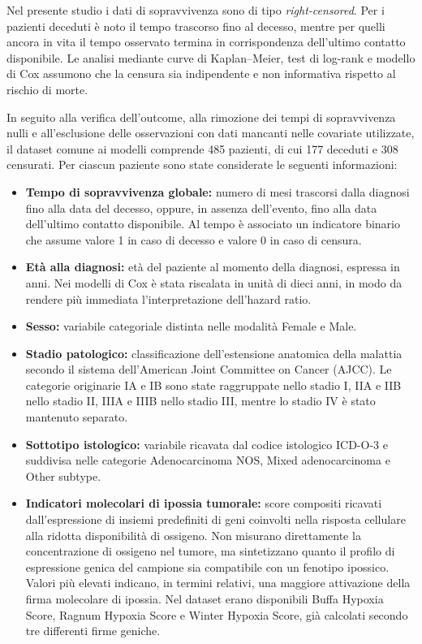 \documentclass[12pt,a4paper]{article}
\begin{document}
Nel presente studio i dati di sopravvivenza sono di tipo \textit{right-censored}. Per i pazienti deceduti è noto il tempo trascorso fino al decesso, mentre per quelli ancora in vita il tempo osservato termina in corrispondenza dell'ultimo contatto disponibile. Le analisi mediante curve di Kaplan--Meier, test di log-rank e modello di Cox assumono che la censura sia indipendente e non informativa rispetto al rischio di morte.

In seguito alla verifica dell'outcome, alla rimozione dei tempi di sopravvivenza nulli e all'esclusione delle osservazioni con dati mancanti nelle covariate utilizzate, il dataset comune ai modelli comprende 485 pazienti, di cui 177 deceduti e 308 censurati. Per ciascun paziente sono state considerate le seguenti informazioni:

\begin{itemize}

    \item \textbf{Tempo di sopravvivenza globale:} numero di mesi trascorsi dalla diagnosi fino alla data del decesso, oppure, in assenza dell'evento, fino alla data dell'ultimo contatto disponibile. Al tempo è associato un indicatore binario che assume valore 1 in caso di decesso e valore 0 in caso di censura.

    \item \textbf{Età alla diagnosi:} età del paziente al momento della diagnosi, espressa in anni. Nei modelli di Cox è stata riscalata in unità di dieci anni, in modo da rendere più immediata l'interpretazione dell'hazard ratio.

    \item \textbf{Sesso:} variabile categoriale distinta nelle modalità Female e Male.

    \item \textbf{Stadio patologico:} classificazione dell'estensione anatomica della malattia secondo il sistema dell'American Joint Committee on Cancer (AJCC). Le categorie originarie IA e IB sono state raggruppate nello stadio I, IIA e IIB nello stadio II, IIIA e IIIB nello stadio III, mentre lo stadio IV è stato mantenuto separato.

    \item \textbf{Sottotipo istologico:} variabile ricavata dal codice istologico ICD-O-3 e suddivisa nelle categorie Adenocarcinoma NOS, Mixed adenocarcinoma e Other subtype.

    \item \textbf{Indicatori molecolari di ipossia tumorale:} score compositi ricavati dall'espressione di insiemi predefiniti di geni coinvolti nella risposta cellulare alla ridotta disponibilità di ossigeno. Non misurano direttamente la concentrazione di ossigeno nel tumore, ma sintetizzano quanto il profilo di espressione genica del campione sia compatibile con un fenotipo ipossico. Valori più elevati indicano, in termini relativi, una maggiore attivazione della firma molecolare di ipossia. Nel dataset erano disponibili Buffa Hypoxia Score, Ragnum Hypoxia Score e Winter Hypoxia Score, già calcolati secondo tre differenti firme geniche.

\end{itemize}
\end{document}
